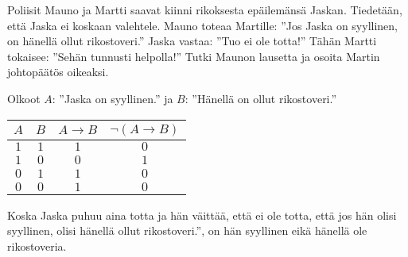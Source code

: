 \begin{tehtava}
     Poliisit Mauno ja Martti saavat kiinni rikoksesta epäilemänsä Jaskan. Tiedetään, että Jaska ei koskaan valehtele. Mauno toteaa Martille: ''Jos Jaska on syyllinen, on hänellä ollut rikostoveri.'' Jaska vastaa: ''Tuo ei ole totta!'' Tähän Martti tokaisee: ''Sehän tunnusti helpolla!'' Tutki Maunon lausetta ja osoita Martin johtopäätös oikeaksi.
    \begin{vastaus}
    
        Olkoot $A$: ''Jaska on syyllinen.'' ja $B$: ''Hänellä on ollut rikostoveri.''
        \begin{center}
		    \begin{tabular}{|c|c|c|c|}\hline
		    $A$ & $B$ & $A\to B$ & $\lnot(A\to B)$ \\ \hline
		    $1$ & $1$ & $1$ & $0$ \\ %
		    $1$ & $0$ & $0$ & $1$ \\
		    $0$ & $1$ & $1$ & $0$ \\
		    $0$ & $0$ & $1$ & $0$ \\ \hline
\end{tabular}
\end{center}
Koska Jaska puhuu aina totta ja hän väittää, että ei ole totta, että jos hän olisi syyllinen, olisi hänellä ollut rikostoveri.'', on hän syyllinen eikä hänellä ole rikostoveria.
    \end{vastaus}
    
\end{tehtava}

